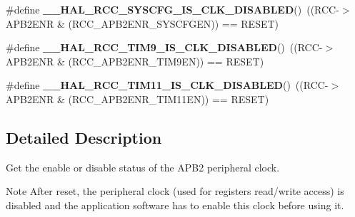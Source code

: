 \begin{DoxyCompactItemize}
\#define {\bfseries \+\_\+\+\_\+\+H\+A\+L\+\_\+\+R\+C\+C\+\_\+\+S\+Y\+S\+C\+F\+G\+\_\+\+I\+S\+\_\+\+C\+L\+K\+\_\+\+D\+I\+S\+A\+B\+L\+ED}()~((R\+CC-\/$>$A\+P\+B2\+E\+NR \& (R\+C\+C\+\_\+\+A\+P\+B2\+E\+N\+R\+\_\+\+S\+Y\+S\+C\+F\+G\+EN)) == R\+E\+S\+ET)
\item 
\mbox{\label{group___r_c_c___a_p_b2___peripheral___clock___enable___disable___status_ga83b7ae4eea41d7c7914716157b4072f4}} 
\#define {\bfseries \+\_\+\+\_\+\+H\+A\+L\+\_\+\+R\+C\+C\+\_\+\+T\+I\+M9\+\_\+\+I\+S\+\_\+\+C\+L\+K\+\_\+\+D\+I\+S\+A\+B\+L\+ED}()~((R\+CC-\/$>$A\+P\+B2\+E\+NR \& (R\+C\+C\+\_\+\+A\+P\+B2\+E\+N\+R\+\_\+\+T\+I\+M9\+EN)) == R\+E\+S\+ET)
\item 
\mbox{\label{group___r_c_c___a_p_b2___peripheral___clock___enable___disable___status_gacee7220c840db84ec10d0b89ab20fa1e}} 
\#define {\bfseries \+\_\+\+\_\+\+H\+A\+L\+\_\+\+R\+C\+C\+\_\+\+T\+I\+M11\+\_\+\+I\+S\+\_\+\+C\+L\+K\+\_\+\+D\+I\+S\+A\+B\+L\+ED}()~((R\+CC-\/$>$A\+P\+B2\+E\+NR \& (R\+C\+C\+\_\+\+A\+P\+B2\+E\+N\+R\+\_\+\+T\+I\+M11\+EN)) == R\+E\+S\+ET)
\end{DoxyCompactItemize}


\subsection{Detailed Description}
Get the enable or disable status of the A\+P\+B2 peripheral clock. 

\begin{DoxyNote}{Note}
After reset, the peripheral clock (used for registers read/write access) is disabled and the application software has to enable this clock before using it. 
\end{DoxyNote}
